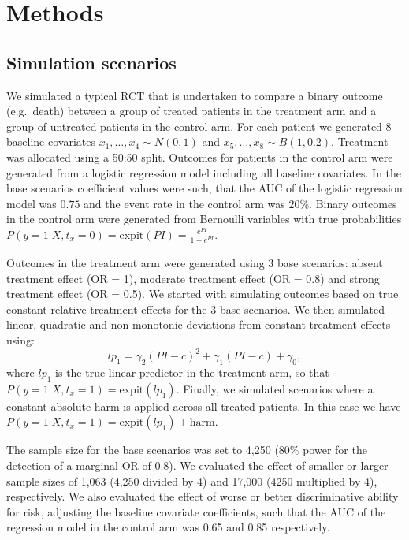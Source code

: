 \documentclass[]{elsarticle} %
\begin{document}
\hypertarget{methods}{%
\section{Methods}\label{methods}}

\hypertarget{simulation-scenarios}{%
\subsection{Simulation scenarios}\label{simulation-scenarios}}

We simulated a typical RCT that is undertaken to compare a binary
outcome (e.g.~death) between a group of treated patients in the
treatment arm and a group of untreated patients in the control arm. For
each patient we generated 8 baseline covariates
\(x_1,\dots,x_4\sim N(0, 1)\) and \(x_5,\dots,x_8\sim B(1, 0.2)\).
Treatment was allocated using a 50:50 split. Outcomes for patients in
the control arm were generated from a logistic regression model
including all baseline covariates. In the base scenarios coefficient
values were such, that the AUC of the logistic regression model was
\(0.75\) and the event rate in the control arm was \(20\%\). Binary
outcomes in the control arm were generated from Bernoulli variables with
true probabilities
\(P(y=1|X, t_x = 0) = \text{expit}(PI)=\frac{e^{PI}}{1+e^{PI}}\).

Outcomes in the treatment arm were generated using 3 base scenarios:
absent treatment effect (OR = 1), moderate treatment effect (OR = 0.8)
and strong treatment effect (OR = 0.5). We started with simulating
outcomes based on true constant relative treatment effects for the 3
base scenarios. We then simulated linear, quadratic and non-monotonic
deviations from constant treatment effects using:
\[lp_1 = \gamma_2(PI-c)^2 + \gamma_1(PI-c) + \gamma_0, \] where \(lp_1\)
is the true linear predictor in the treatment arm, so that
\(P(y=1|X, t_x=1) = \text{expit}(lp_1)\). Finally, we simulated
scenarios where a constant absolute harm is applied across all treated
patients. In this case we have
\(P(y=1|X,t_x=1) = \text{expit}(lp_1) + \text{harm}\).

The sample size for the base scenarios was set to 4,250 (\(80\%\) power
for the detection of a marginal OR of 0.8). We evaluated the effect of
smaller or larger sample sizes of 1,063 (4,250 divided by 4) and 17,000
(4250 multiplied by 4), respectively. We also evaluated the effect of
worse or better discriminative ability for risk, adjusting the baseline
covariate coefficients, such that the AUC of the regression model in the
control arm was 0.65 and 0.85 respectively.
\end{document}
